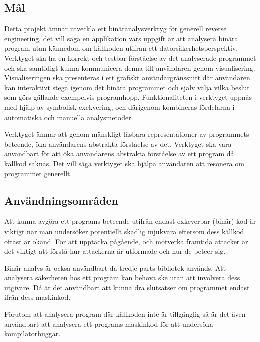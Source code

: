 
\subsection{Mål}
Detta projekt ämnar utveckla ett binäranalysverktyg för generell reverse
engineering, det vill säga en applikation vars uppgift är att analysera binära
program utan kännedom om källkoden utifrån ett datorsäkerhetsperspektiv.
Verktyget ska ha en korrekt och testbar förståelse av det analyserade programmet
och ska samtidigt kunna kommunicera denna till användaren genom visualisering.
Visualiseringen ska presenteras i ett grafiskt användargränssnitt där användaren
kan interaktivt stega igenom det binära programmet och själv välja vilka beslut
som görs gällande exempelvis programhopp. Funktionaliteten i verktyget uppnås
med hjälp av symbolisk exekvering, och därigenom kombineras fördelarna i
automatiska och manuella analysmetoder.

Verktyget ämnar att genom mänskligt läsbara representationer av programmets 
beteende, öka användarens abstrakta förståelse av det. Verktyget ska vara 
användbart för att öka användarens abstrakta förståelse av ett program då källkod 
saknas. Det vill säga verktyget ska hjälpa användaren att resonera om programmet 
generellt. 

\subsection{Användningsområden}
Att kunna avgöra ett programs beteende utifrån endast exkeverbar (binär) 
kod är viktigt när man undersöker potentiellt skadlig mjukvara eftersom
dess källkod oftast är okänd. För att upptäcka pågående, och motverka 
framtida attacker är det viktigt att förstå hur attackerna är utformade och
hur de beteer sig. 

Binär analys är också användbart då tredje-parts bibliotek används.
Att analysera säkerheten hos ett program kan behöva ske utan att involvera 
dess utgivare. Då är det användbart att kunna dra slutsatser om programmet 
endast ifrån dess maskinkod. 

Förutom att analysera program där källkoden inte är tillgänglig så är det även 
användbart att analysera ett programs maskinkod för att undersöka kompilatorbuggar.





